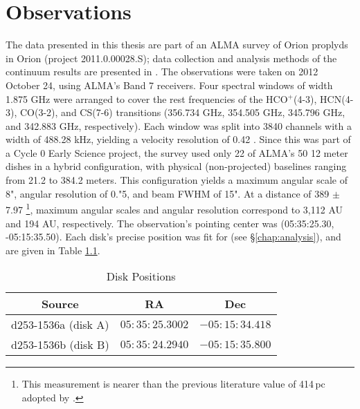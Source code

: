 \chapter{Observations}
\label{chap:observations}




The data presented in this thesis are part of an ALMA survey of Orion proplyds in Orion (project 2011.0.00028.S); data collection and analysis methods of the continuum results are presented in \citet{Mann2014}. The observations were taken on 2012 October 24, using ALMA's Band 7 receivers. Four spectral windows of width 1.875 GHz were arranged to cover the rest frequencies of the HCO$^+$(4-3), HCN(4-3), CO(3-2), and CS(7-6) transitions (356.734 GHz, 354.505 GHz, 345.796 GHz, and 342.883 GHz, respectively). Each window was split into 3840 channels with a width of 488.28 kHz, yielding a velocity resolution of 0.42 \kms. Since this was part of a Cycle 0 Early Science project, the survey used only 22 of ALMA's 50 12 meter dishes in a hybrid configuration, with physical (non-projected) baselines ranging from 21.2 to 384.2 meters. This configuration yields a maximum angular scale of 8", angular resolution of 0."5, and beam FWHM of 15". At a distance of 389 $\pm$ 7.97 \citep{GaiaCollaboration2016,GaiaCollaboration2018}\footnote{This measurement is nearer than the previous literature value of 414\,pc adopted by \citep{Factor2017}.}, maximum angular scales and angular resolution correspond to 3,112 AU and 194 AU, respectively. The observation's pointing center was (05:35:25.30, -05:15:35.50). Each disk's precise position was fit for (see \S\ref{chap:analysis}), and are given in Table \ref{table:disk_positions}.

\begin{table}
  \centering
  \caption{Disk Positions}
  \label{table:disk_positions}
  \renewcommand{\arraystretch}{1.2}
  \begin{tabular}{c | c | c }
    \toprule \toprule
      Source      &  RA            & Dec \\
    \midrule %
      d253-1536a (disk A)  &  $05:35:25.3002$ & $-05:15:34.418$  \\
      d253-1536b (disk B)  &  $05:35:24.2940$ & $-05:15:35.800$  \\
    \bottomrule
  \end{tabular}
\end{table}

